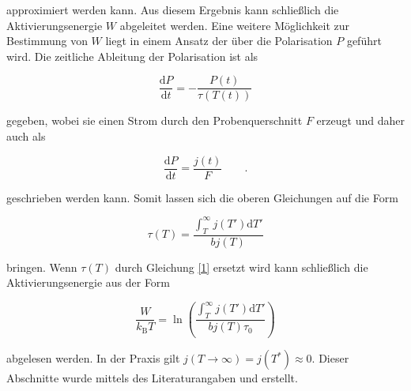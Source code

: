approximiert werden kann.
Aus diesem Ergebnis kann schließlich die Aktivierungsenergie $W$ abgeleitet werden.
Eine weitere Möglichkeit zur Bestimmung von $W$ liegt in einem Ansatz der über 
die Polarisation $P$ geführt wird.
Die zeitliche Ableitung der Polarisation ist als

\begin{equation*}
    \frac{\mathrm{d}P}{\mathrm{d}t} = - \frac{ P(t) }{ \tau(T(t))}
\end{equation*}

gegeben, wobei sie einen Strom durch den Probenquerschnitt $F$ erzeugt und daher auch als

\begin{equation*}
    \frac{\mathrm{d}P}{\mathrm{d}t} = \frac{j(t)}{F} \qquad.
\end{equation*}

geschrieben werden kann.
Somit lassen sich die oberen Gleichungen auf die Form 

\begin{equation*}
    \tau(T) = \frac{ \int_{T}^\infty j(T') \mathrm{d}T' }{ b j(T) } 
\end{equation*}

bringen. Wenn $\tau(T)$ durch Gleichung \eqref{1} ersetzt wird kann 
schließlich die Aktivierungsenergie aus der Form 

\begin{equation}
    \frac{ W }{ k_{\mathrm{B}} T } = \ln{ \left( \frac{ \int_{T}^\infty j(T') \mathrm{d}T' }{ b j(T) \tau_{\text{0}} } \right) }
    \label{eq3}
\end{equation}

abgelesen werden. In der Praxis gilt
$j(T \to \infty) = j(T^*)  \approx 0$.
Dieser Abschnitte wurde mittels des Literaturangaben 
\cite{Bucci}
\cite{Fuller}
\cite{Muccillo}
und
\cite{Becker}
erstellt.